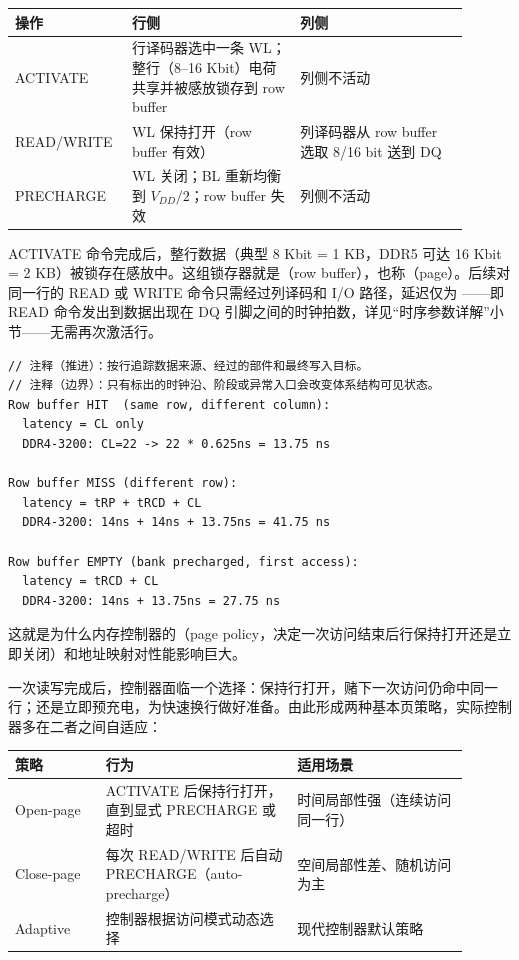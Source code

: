 \begin{longtable}{L{0.2\linewidth}L{0.35\linewidth}L{0.35\linewidth}}
\toprule
操作 & 行侧 & 列侧 \\
\midrule
ACTIVATE & 行译码器选中一条 WL；整行（8--16 Kbit）电荷共享并被感放锁存到 row buffer & 列侧不活动 \\\tablerowrule
READ/WRITE & WL 保持打开（row buffer 有效） & 列译码器从 row buffer 选取 8/16 bit 送到 DQ \\\tablerowrule
PRECHARGE & WL 关闭；BL 重新均衡到 $V_{DD}/2$；row buffer 失效 & 列侧不活动 \\
\bottomrule
\end{longtable}


ACTIVATE 命令完成后，整行数据（典型 8 Kbit = 1 KB，DDR5 可达 16 Kbit = 2 KB）被锁存在感放中。这组锁存器就是（row buffer），也称（page）。后续对同一行的 READ 或 WRITE 命令只需经过列译码和 I/O 路径，延迟仅为 ——即 READ 命令发出到数据出现在 DQ 引脚之间的时钟拍数，详见“时序参数详解”小节——无需再次激活行。

\begin{lstlisting}[numbers=none,caption={行缓冲命中与未命中的延迟对比}]
// 注释（推进）：按行追踪数据来源、经过的部件和最终写入目标。
// 注释（边界）：只有标出的时钟沿、阶段或异常入口会改变体系结构可见状态。
Row buffer HIT  (same row, different column):
  latency = CL only
  DDR4-3200: CL=22 -> 22 * 0.625ns = 13.75 ns

Row buffer MISS (different row):
  latency = tRP + tRCD + CL
  DDR4-3200: 14ns + 14ns + 13.75ns = 41.75 ns

Row buffer EMPTY (bank precharged, first access):
  latency = tRCD + CL
  DDR4-3200: 14ns + 13.75ns = 27.75 ns
\end{lstlisting}

这就是为什么内存控制器的（page policy，决定一次访问结束后行保持打开还是立即关闭）和地址映射对性能影响巨大。


一次读写完成后，控制器面临一个选择：保持行打开，赌下一次访问仍命中同一行；还是立即预充电，为快速换行做好准备。由此形成两种基本页策略，实际控制器多在二者之间自适应：

\begin{longtable}{L{0.18\linewidth}L{0.38\linewidth}L{0.34\linewidth}}
\toprule
策略 & 行为 & 适用场景 \\
\midrule
Open-page & ACTIVATE 后保持行打开，直到显式 PRECHARGE 或超时 & 时间局部性强（连续访问同一行） \\\tablerowrule
Close-page & 每次 READ/WRITE 后自动 PRECHARGE（auto-precharge） & 空间局部性差、随机访问为主 \\\tablerowrule
Adaptive & 控制器根据访问模式动态选择 & 现代控制器默认策略 \\
\bottomrule
\end{longtable}

